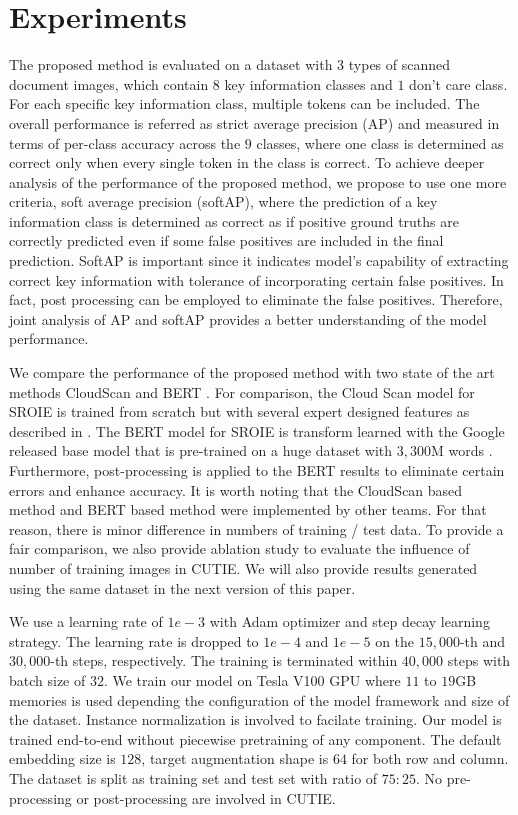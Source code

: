 \documentclass[10pt,twocolumn,letterpaper]{article}
\begin{document}
\section{Experiments}
\label{experiment}
The proposed method is evaluated on a dataset with $3$ types of scanned document images, which contain $8$ key information classes and $1$ don't care class. For each specific key information class, multiple tokens can be included. The overall performance is referred as strict average precision (AP) and measured in terms of per-class accuracy across the $9$ classes, where one class is determined as correct only when every single token in the class is correct. To achieve deeper analysis of the performance of the proposed method, we propose to use one more criteria, soft average precision (softAP), where the prediction of a key information class is determined as correct as if positive ground truths are correctly predicted even if some false positives are included in the final prediction. SoftAP is important since it indicates model's capability of extracting correct key information with tolerance of incorporating certain false positives. In fact, post processing can be employed to eliminate the false positives. Therefore, joint analysis of AP and softAP provides a better understanding of the model performance.

We compare the performance of the proposed method with two state of the art methods CloudScan \cite{cloudscan} and BERT \cite{bert}. For comparison, the Cloud Scan model for SROIE is trained from scratch but with several expert designed features as described in \cite{cloudscan}. The BERT model for SROIE is transform learned with the Google released base model that is pre-trained on a huge dataset with $3,300$M words \cite{bert,bertgit}. Furthermore, post-processing is applied to the BERT results to eliminate certain errors and enhance accuracy. It is worth noting that the CloudScan based method and BERT based method were implemented by other teams. For that reason, there is minor difference in numbers of training / test data. To provide a fair comparison, we also provide ablation study to evaluate the influence of number of training images in CUTIE. We will also provide results generated using the same dataset in the next version of this paper.

We use a learning rate of $1e-3$ with Adam optimizer and step decay learning strategy. The learning rate is dropped to $1e-4$ and $1e-5$ on the $15,000$-th and $30,000$-th steps, respectively. The training is terminated within $40,000$ steps with batch size of $32$. We train our model on Tesla V100 GPU where $11$ to $19$GB memories is used depending the configuration of the model framework and size of the dataset. Instance normalization is involved to facilate training. Our model is trained end-to-end without piecewise pretraining of any component. The default embedding size is $128$, target augmentation shape is $64$ for both row and column. The dataset is split as training set and test set with ratio of $75:25$. No pre-processing or post-processing are involved in CUTIE.
\end{document}
